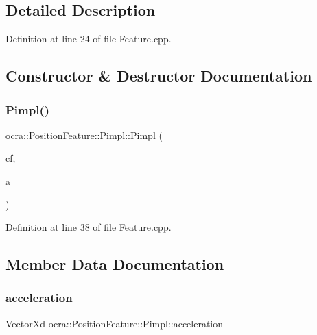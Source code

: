 \subsection{Detailed Description}


Definition at line 24 of file Feature.\+cpp.



\subsection{Constructor \& Destructor Documentation}
\hypertarget{structocra_1_1PositionFeature_1_1Pimpl_ad886f374a5f070290519a8ccbaff9ab8}{}\label{structocra_1_1PositionFeature_1_1Pimpl_ad886f374a5f070290519a8ccbaff9ab8} 
\subsubsection{\texorpdfstring{Pimpl()}{Pimpl()}}
{\footnotesize\ttfamily ocra\+::\+Position\+Feature\+::\+Pimpl\+::\+Pimpl (\begin{DoxyParamCaption}\item[{Control\+Frame\+::\+Ptr}]{cf,  }\item[{\hyperlink{namespaceocra_a436781c7059a0f76027df1c652126260}{E\+Cartesian\+Dof}}]{a }\end{DoxyParamCaption})\hspace{0.3cm}{\ttfamily [inline]}}



Definition at line 38 of file Feature.\+cpp.



\subsection{Member Data Documentation}
\hypertarget{structocra_1_1PositionFeature_1_1Pimpl_a2a251a27da0e093461ba88a7dcb5ce1d}{}\label{structocra_1_1PositionFeature_1_1Pimpl_a2a251a27da0e093461ba88a7dcb5ce1d} 
\subsubsection{\texorpdfstring{acceleration}{acceleration}}
{\footnotesize\ttfamily Vector\+Xd ocra\+::\+Position\+Feature\+::\+Pimpl\+::acceleration}



